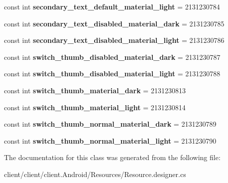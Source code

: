 \begin{DoxyCompactItemize}
\item 
\hypertarget{classClient_1_1Droid_1_1Resource_1_1Color_a08996db2c9cd6384d8cb5acde6c77085}{}const int {\bfseries secondary\+\_\+text\+\_\+default\+\_\+material\+\_\+light} = 2131230784\label{classClient_1_1Droid_1_1Resource_1_1Color_a08996db2c9cd6384d8cb5acde6c77085}

\item 
\hypertarget{classClient_1_1Droid_1_1Resource_1_1Color_a1d11a865379b3be64e9014411d594d4c}{}const int {\bfseries secondary\+\_\+text\+\_\+disabled\+\_\+material\+\_\+dark} = 2131230785\label{classClient_1_1Droid_1_1Resource_1_1Color_a1d11a865379b3be64e9014411d594d4c}

\item 
\hypertarget{classClient_1_1Droid_1_1Resource_1_1Color_a3b867459c6ca4c4faa90df250793928c}{}const int {\bfseries secondary\+\_\+text\+\_\+disabled\+\_\+material\+\_\+light} = 2131230786\label{classClient_1_1Droid_1_1Resource_1_1Color_a3b867459c6ca4c4faa90df250793928c}

\item 
\hypertarget{classClient_1_1Droid_1_1Resource_1_1Color_ae22bb63c7ef0874cb77fc2373eb1e859}{}const int {\bfseries switch\+\_\+thumb\+\_\+disabled\+\_\+material\+\_\+dark} = 2131230787\label{classClient_1_1Droid_1_1Resource_1_1Color_ae22bb63c7ef0874cb77fc2373eb1e859}

\item 
\hypertarget{classClient_1_1Droid_1_1Resource_1_1Color_a1c2efc5909991a9731b0fb0bcf9dee18}{}const int {\bfseries switch\+\_\+thumb\+\_\+disabled\+\_\+material\+\_\+light} = 2131230788\label{classClient_1_1Droid_1_1Resource_1_1Color_a1c2efc5909991a9731b0fb0bcf9dee18}

\item 
\hypertarget{classClient_1_1Droid_1_1Resource_1_1Color_ac48e3c007d4e9195efae2191967f9870}{}const int {\bfseries switch\+\_\+thumb\+\_\+material\+\_\+dark} = 2131230813\label{classClient_1_1Droid_1_1Resource_1_1Color_ac48e3c007d4e9195efae2191967f9870}

\item 
\hypertarget{classClient_1_1Droid_1_1Resource_1_1Color_a935a1e271dd10e0a4298db30c2c8bc48}{}const int {\bfseries switch\+\_\+thumb\+\_\+material\+\_\+light} = 2131230814\label{classClient_1_1Droid_1_1Resource_1_1Color_a935a1e271dd10e0a4298db30c2c8bc48}

\item 
\hypertarget{classClient_1_1Droid_1_1Resource_1_1Color_ac5f683215ece2134d534b281e4d854ae}{}const int {\bfseries switch\+\_\+thumb\+\_\+normal\+\_\+material\+\_\+dark} = 2131230789\label{classClient_1_1Droid_1_1Resource_1_1Color_ac5f683215ece2134d534b281e4d854ae}

\item 
\hypertarget{classClient_1_1Droid_1_1Resource_1_1Color_a04f92b89c9eb63317982712e9d31dc71}{}const int {\bfseries switch\+\_\+thumb\+\_\+normal\+\_\+material\+\_\+light} = 2131230790\label{classClient_1_1Droid_1_1Resource_1_1Color_a04f92b89c9eb63317982712e9d31dc71}

\end{DoxyCompactItemize}


The documentation for this class was generated from the following file\+:\begin{DoxyCompactItemize}
\item 
client/client/client.\+Android/\+Resources/Resource.\+designer.\+cs\end{DoxyCompactItemize}
